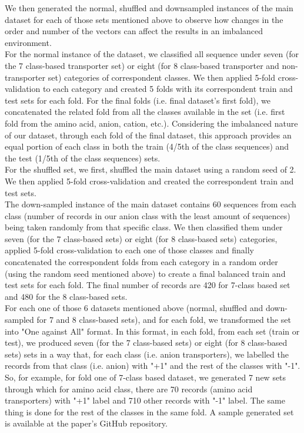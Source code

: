     We then generated the normal, shuffled and downsampled instances of the main dataset for each of 
    those sets mentioned above to observe how changes in the order and number of the vectors can affect 
    the results in an imbalanced environment.\\

    For the normal instance of the dataset, we classified all sequence under seven 
    (for the 7 class-based transporter set) or eight (for 8 class-based transporter and non-transporter set) 
    categories of correspondent classes. We then applied 5-fold cross-validation to each category and 
    created 5 folds with its correspondent train and test sets for each fold. For the final folds 
    (i.e. final dataset's first fold), we concatenated the related fold from all the classes available in the set 
    (i.e. first fold from the amino acid, anion, cation, etc.). Considering the imbalanced nature of our dataset, 
    through each fold of the final dataset, this approach provides an equal portion of each class in both the train 
    (4/5th of the class sequences) and the test (1/5th of the class sequences) sets.\\

    For the shuffled set, we first, shuffled the main dataset using a random seed of 2. 
    We then applied 5-fold cross-validation and created the correspondent train and test sets.\\

    The down-sampled instance of the main dataset contains 60 sequences from each class 
    (number of records in our anion class with the least amount of sequences) being taken 
    randomly from that specific class. We then classified them under seven (for the 7 class-based sets) 
    or eight (for 8 class-based sets) categories, applied 5-fold cross-validation to each one of those classes and 
    finally concatenated the correspondent folds from each category in a random order (using the random seed mentioned above) 
    to create a final balanced train and test sets for each fold. The final number of records are 420 for 
    7-class based set and 480 for the 8 class-based sets.\\


    For each one of those 6 datasets mentioned above (normal, shuffled and down-sampled 
    for 7 and 8 class-based sets), and for each fold, we transformed the set into "One against All" format. 
    In this format, in each fold, from each set (train or test), we produced seven (for the 7 class-based sets) 
    or eight (for 8 class-based sets) sets in a way that, for each class (i.e. anion transporters), 
    we labelled the records from that class (i.e. anion) with "+1" and the rest of the classes with "-1". 
    So, for example, for fold one of 7-class based dataset, we generated 7 new sets through which for amino acid class, 
    there are 70 records (amino acid transporters) with "+1" label and 710 other records with "-1" label. 
    The same thing is done for the rest of the classes in the same fold. A sample generated set is available at 
    the paper’s GitHub repository. \\


